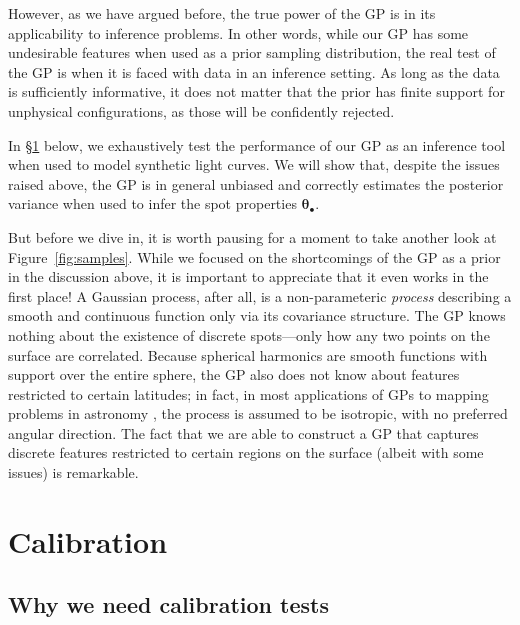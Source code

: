 \documentclass[modern]{aastex62}
\begin{document}
However, as we have argued before, the true power of the GP is in its
applicability to inference problems. In other words, while our GP has some
undesirable features when used as a prior sampling distribution, the real test
of the GP is when it is faced with data in an inference setting.
As long as the data is sufficiently informative, it does not matter that the
prior has finite support for unphysical configurations, as those
will be confidently rejected.

In \S\ref{sec:calibration} below, we exhaustively test the performance of our
GP as an inference tool when used to model synthetic light curves. We will
show that, despite the issues raised above, the GP is in general unbiased and
correctly estimates the posterior variance when used to infer the spot
properties $\pmb{\theta}_\bullet$.

But before we dive in, it is worth pausing for a moment to take another
look at Figure~\ref{fig:samples}. While we focused on the shortcomings of
the GP as a prior in the discussion above, it is important to appreciate
that it even works in the first place!
A Gaussian process, after all, is a non-parameteric
\emph{process} describing a smooth and continuous function only via its
covariance structure. The GP knows nothing about the existence of discrete
spots---only how any two points on the surface are correlated.
Because spherical harmonics are smooth functions with support over the
entire sphere, the GP also does not know about features restricted
to certain latitudes; in fact, in most applications of GPs to mapping
problems in astronomy \citep[such as in models of the cosmic microwave
    background; e.g.,][]{Wandelt2012}, the process is assumed to be isotropic,
with no preferred angular direction.
The fact that we are able to construct a GP that captures discrete
features restricted to certain regions on the surface (albeit with
some issues) is remarkable.

\section{Calibration}
\label{sec:calibration}

\subsection{Why we need calibration tests}
\label{sec:why-calibrate}
\end{document}

